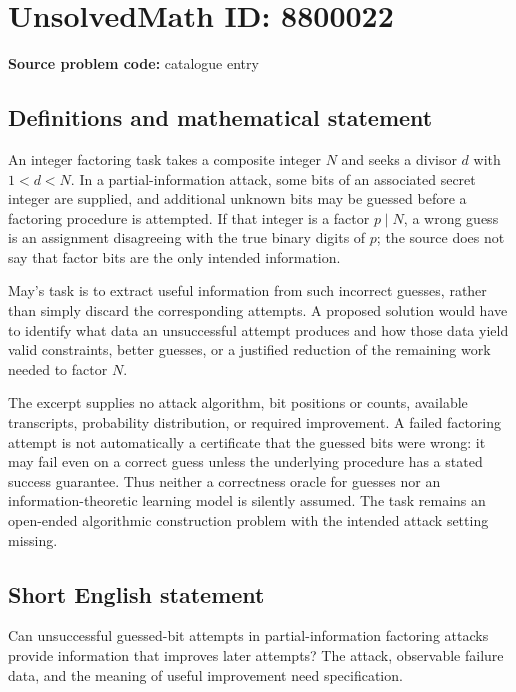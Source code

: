 \documentclass[11pt]{article}
\begin{document}
\section*{UnsolvedMath ID: 8800022}
\textbf{Source problem code:} catalogue entry
\subsection{Definitions and mathematical statement}
An integer factoring task takes a composite integer \(N\) and seeks a divisor \(d\) with \(1<d<N\). In a partial-information attack, some bits of an associated secret integer are supplied, and additional unknown bits may be guessed before a factoring procedure is attempted. If that integer is a factor \(p\mid N\), a wrong guess is an assignment disagreeing with the true binary digits of \(p\); the source does not say that factor bits are the only intended information.

May's task is to extract useful information from such incorrect guesses, rather than simply discard the corresponding attempts. A proposed solution would have to identify what data an unsuccessful attempt produces and how those data yield valid constraints, better guesses, or a justified reduction of the remaining work needed to factor \(N\).

The excerpt supplies no attack algorithm, bit positions or counts, available transcripts, probability distribution, or required improvement. A failed factoring attempt is not automatically a certificate that the guessed bits were wrong: it may fail even on a correct guess unless the underlying procedure has a stated success guarantee. Thus neither a correctness oracle for guesses nor an information-theoretic learning model is silently assumed. The task remains an open-ended algorithmic construction problem with the intended attack setting missing.
\subsection{Short English statement}
Can unsuccessful guessed-bit attempts in partial-information factoring attacks provide information that improves later attempts? The attack, observable failure data, and the meaning of useful improvement need specification.
\end{document}
